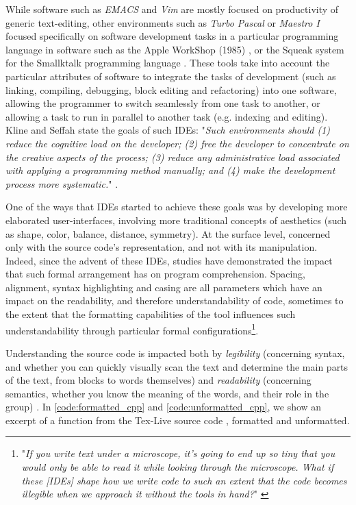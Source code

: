 While software such as \emph{EMACS} and \emph{Vim} are mostly focused on productivity of generic text-editing, other environments such as \emph{Turbo Pascal} or \emph{Maestro I} focused specifically on software development tasks in a particular programming language in software such as the Apple WorkShop (1985) \citep{west_macintosh_1987}, or the Squeak system for the Smallktalk programming language \citep{ingalls_back_1997}. These tools take into account the particular attributes of software to integrate the tasks of development (such as linking, compiling, debugging, block editing and refactoring) into one software, allowing the programmer to switch seamlessly from one task to another, or allowing a task to run in parallel to another task (e.g. indexing and editing). Kline and Seffah state the goals of such IDEs: "\emph{Such environments should (1) reduce the cognitive load on the developer; (2) free the developer to concentrate on the creative aspects of the process; (3) reduce any administrative load associated with applying a programming method manually; and (4) make the development process more systematic.}" \citep{kline_evaluation_2005}.

One of the ways that IDEs started to achieve these goals was by developing more elaborated user-interfaces, involving more traditional concepts of aesthetics (such as shape, color, balance, distance, symmetry). At the surface level, concerned only with the source code's representation, and not with its manipulation. Indeed, since the advent of these IDEs, studies have demonstrated the impact that such formal arrangement has on program comprehension\citep{oman_typographic_1990,oliveira_systematic_2022}. Spacing, alignment, syntax highlighting and casing are all parameters which have an impact on the readability, and therefore understandability of code, sometimes to the extent that the formatting capabilities of the tool influences such understandability through particular formal configurations\footnote{"\emph{If you write text under a microscope, it’s going to end up so tiny that you would only be able to read it while looking through the microscope. What if these [IDEs] shape how we write code to such an extent that the code becomes illegible when we approach it without the tools in hand?}" \citep{ball_how_2020}}.

Understanding the source code is impacted both by \emph{legibility} (concerning syntax, and whether you can quickly visually scan the text and determine the main parts of the text, from blocks to words themselves) and \emph{readability} (concerning semantics, whether you know the meaning of the words, and their role in the group) \citep{oliveira_evaluating_2020,jacques_understanding_2015}. In \autoref{code:formatted_cpp} and \autoref{code:unformatted_cpp}, we show an excerpt of a function from the Tex-Live source code \citep{berry_texlive_2022}, formatted and unformatted.

